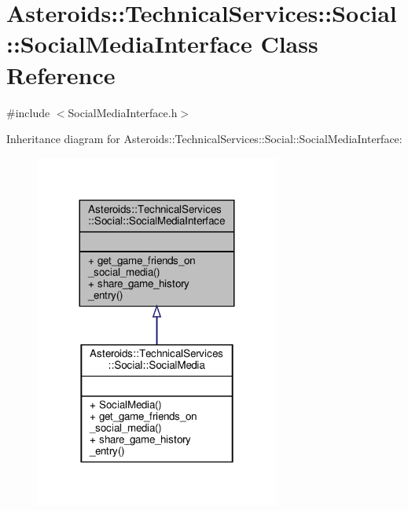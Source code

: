 \hypertarget{classAsteroids_1_1TechnicalServices_1_1Social_1_1SocialMediaInterface}{}\section{Asteroids\+:\+:Technical\+Services\+:\+:Social\+:\+:Social\+Media\+Interface Class Reference}
\label{classAsteroids_1_1TechnicalServices_1_1Social_1_1SocialMediaInterface}


{\ttfamily \#include $<$Social\+Media\+Interface.\+h$>$}



Inheritance diagram for Asteroids\+:\+:Technical\+Services\+:\+:Social\+:\+:Social\+Media\+Interface\+:
\nopagebreak
\begin{figure}[H]
\begin{center}
\leavevmode
\includegraphics[width=227pt]{classAsteroids_1_1TechnicalServices_1_1Social_1_1SocialMediaInterface__inherit__graph}
\end{center}
\end{figure}


